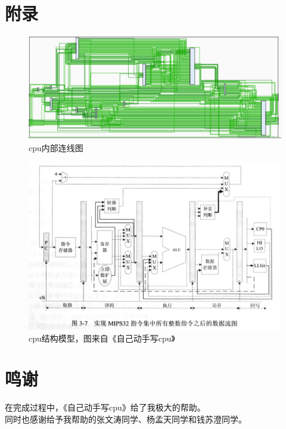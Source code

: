 \documentclass{article}
\begin{document}
\section{附录}
\begin{figure}[ht]
\centering
\includegraphics[scale=0.4]{cpu.png}
\caption{cpu内部连线图}
\end{figure}
\begin{figure}[ht]
\centering
\includegraphics[scale=0.4]{structure.png}
\caption{cpu结构模型，图来自《自己动手写cpu》}
\end{figure}
\section{鸣谢}
在完成过程中，《自己动手写cpu》给了我极大的帮助。\\
\indent
同时也感谢给予我帮助的张文涛同学、杨孟天同学和钱苏澄同学。
\end{document}
